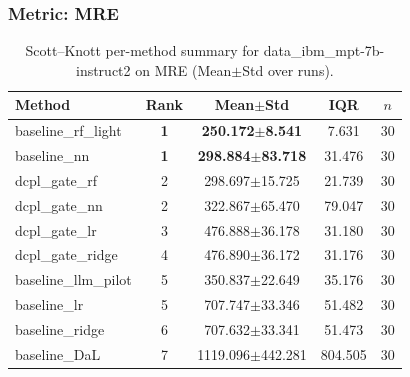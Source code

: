 \subsubsection*{Metric: MRE}
\begin{table}[H]
\centering
\scriptsize
\setlength{\tabcolsep}{4pt}
\renewcommand{\arraystretch}{1.1}
\caption{Scott--Knott per-method summary for data\_ibm\_mpt-7b-instruct2 on MRE (Mean$\pm$Std over runs).}
\label{tab:sk_data_ibm_mpt-7b-instruct2_MRE}
\begin{tabular}{l|c|c|c|c}
\hline
\textbf{Method} & \textbf{Rank} & \textbf{Mean$\pm$Std} & \textbf{IQR} & \textbf{$n$} \\
\hline
\rowcolor{red!15} baseline\_rf\_light & \textbf{1} & \textbf{250.172$\pm$8.541} & 7.631 & 30 \\
\rowcolor{red!15} baseline\_nn & \textbf{1} & \textbf{298.884$\pm$83.718} & 31.476 & 30 \\
dcpl\_gate\_rf & 2 & 298.697$\pm$15.725 & 21.739 & 30 \\
dcpl\_gate\_nn & 2 & 322.867$\pm$65.470 & 79.047 & 30 \\
dcpl\_gate\_lr & 3 & 476.888$\pm$36.178 & 31.180 & 30 \\
dcpl\_gate\_ridge & 4 & 476.890$\pm$36.172 & 31.176 & 30 \\
baseline\_llm\_pilot & 5 & 350.837$\pm$22.649 & 35.176 & 30 \\
baseline\_lr & 5 & 707.747$\pm$33.346 & 51.482 & 30 \\
baseline\_ridge & 6 & 707.632$\pm$33.341 & 51.473 & 30 \\
baseline\_DaL & 7 & 1119.096$\pm$442.281 & 804.505 & 30 \\
\hline
\end{tabular}
\end{table}
